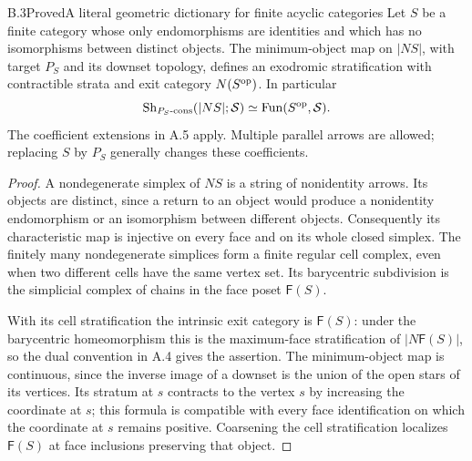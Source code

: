 \begin{statement}{B.3}{Proved}{A literal geometric dictionary for finite acyclic categories}
Let $S$ be a finite category whose only endomorphisms are identities and
which has no isomorphisms between distinct objects. The minimum-object
map on $|NS|$, with target $P_S$ and its downset topology, defines an
exodromic stratification with contractible strata and exit category
$N(S^{\mathrm{op}})$. In particular
\[
 \operatorname{Sh}_{P_S\text{-cons}}(|NS|;\mathcal S)
       \simeq \operatorname{Fun}(S^{\mathrm{op}},\mathcal S).
\]
The coefficient extensions in A.5 apply. Multiple parallel arrows are
allowed; replacing $S$ by $P_S$ generally changes these coefficients.
\end{statement}
\begin{proof}
A nondegenerate simplex of $NS$ is a string of nonidentity arrows. Its
objects are distinct, since a return to an object would produce a
nonidentity endomorphism or an isomorphism between different objects.
Consequently its characteristic map is injective on every face and on
its whole closed simplex. The finitely many nondegenerate simplices
form a finite regular cell complex, even when two different cells have
the same vertex set. Its barycentric subdivision is the simplicial
complex of chains in the face poset $\mathsf F(S)$.

With its cell stratification the intrinsic exit category is
$\mathsf F(S)$: under the barycentric homeomorphism this is the
maximum-face stratification of $|N\mathsf F(S)|$, so the dual convention
in A.4 gives the assertion. The minimum-object map is continuous,
since the inverse image of a downset is the union of the open stars of
its vertices. Its stratum at $s$ contracts to the vertex $s$ by increasing
the coordinate at $s$; this formula is compatible with every face
identification on which the coordinate at $s$ remains positive.
Coarsening the cell stratification localizes $\mathsf F(S)$ at face
inclusions preserving that object.


\end{proof}
